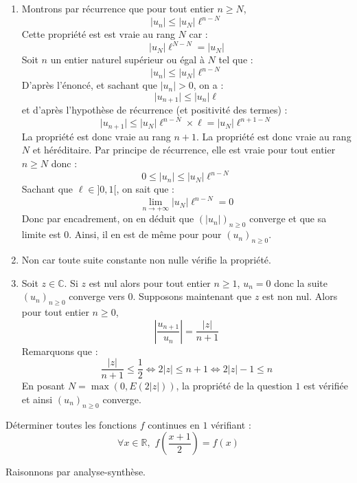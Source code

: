 \documentclass[a4paper,10pt]{report}
\begin{document}
\corr 

\begin{enumerate}
\item Montrons par récurrence que pour tout entier $n \geq N$,
$$ \vert u_n \vert  \leq \vert u_N \vert  \ell^{n-N}$$
Cette propriété est est vraie au rang $N$ car :
$$ \vert u_N \vert \ell^{N-N} = \vert u_N \vert $$
Soit $n$ un entier naturel supérieur ou égal à $N$ tel que :
$$  \vert u_n \vert \leq \vert u_N \vert \ell^{n-N}$$
D'après l'énoncé, et sachant que $\vert u_n \vert >0$, on a :
$$ \vert u_{n+1} \vert \leq \vert u_n \vert \ell$$
et d'après l'hypothèse de récurrence (et positivité des termes) : 
$$  \vert u_{n+1} \vert \leq \vert u_N \vert \ell^{n-N} \times \ell = \vert u_N \vert \ell^{n+1-N}$$
La propriété est donc vraie au rang $n+1$. La propriété est donc vraie au rang $N$ et héréditaire. Par principe de récurrence, elle est vraie pour tout entier $n \geq N$ donc :
$$ 0 \leq \vert u_n \vert \leq  \vert u_N \vert  \ell^{n-N}$$
Sachant que $\ell \in ]0,1[$, on sait que :
$$ \lim_{n \rightarrow + \infty} \vert u_N \vert  \ell^{n-N} = 0$$
Donc par encadrement, on en déduit que $(\vert u_n \vert)_{n \geq 0}$ converge et que sa limite est $0$. Ainsi, il en est de même pour pour $(u_n)_{n \geq 0}$.
\item Non car toute suite constante non nulle vérifie la propriété.
\item Soit $z \in \mathbb{C}$. Si $z$ est nul alors pour tout entier $n \geq 1$, $u_n=0$ donc la suite $(u_n)_{n \geq 0}$ converge vers $0$. Supposons maintenant que $z$ est non nul. Alors pour tout entier $n \geq 0$,
$$ \left\vert \dfrac{u_{n+1}}{u_n} \right\vert =\dfrac{\vert z \vert}{n+1}$$
Remarquons que :
$$ \dfrac{\vert z \vert}{n+1} \leq \dfrac{1}{2} \Longleftrightarrow  2 \vert z \vert \leq n+1 \Longleftrightarrow 2 \vert z \vert - 1 \leq n$$
En posant $N = \max(0, E(2 \vert z\vert))$, la propriété de la question $1$ est vérifiée et ainsi $(u_n)_{n \geq 0}$ converge.
\end{enumerate}

\medskip

\begin{Exercice}{} Déterminer toutes les fonctions $f$ continues en $1$ vérifiant :
$$ \forall x \in \mathbb{R}, \, \, f \left( \frac{x+1}{2} \right) =f(x)$$
\end{Exercice}

\corr Raisonnons par analyse-synthèse.

\medskip
\end{document}
